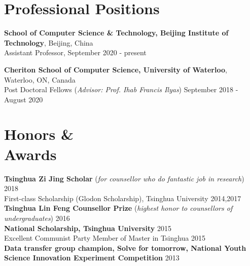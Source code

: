 \documentclass[margin]{cv}
\newenvironment{list1}{
  \begin{list}{\ding{113}}{%
      \setlength{\itemsep}{0in}
      \setlength{\parsep}{0in} \setlength{\pars
      kip}{0in}
      \setlength{\topsep}{0in} \setlength{\partopsep}{0in} 
      \setlength{\leftmargin}{0.17in}}}{\end{list}}
\newenvironment{list2}{
  \begin{list}{$\bullet$}{%
      \setlength{\itemsep}{0in}
      \setlength{\parsep}{0in} \setlength{\parskip}{0in}
      \setlength{\topsep}{0in} \setlength{\partopsep}{0in} 
      \setlength{\leftmargin}{0.2in}}}{\end{list}}
\begin{document}
\begin{resume}

\section{\sc Professional Positions}
{\bf School of Computer Science \& Technology, Beijing Institute of Technology}, Beijing, China \\
Assistant Professor, \hfill September 2020 - present

{\bf Cheriton School of Computer Science, University of Waterloo}, Waterloo, ON, Canada \\
Post Doctoral Fellows ({\it Advisor: Prof. Ihab Francis Ilyas}) \hfill September 2018 - August 2020

\section{\sc Honors \& \\ Awards}
{\bf Tsinghua Zi Jing Scholar} ({\it for counsellor who do fantastic job in research}) \hfill 2018 \\
First-class Scholarship (Glodon Scholarship), Tsinghua University \hfill 2014,2017 \\
{\bf Tsinghua Lin Feng Counsellor Prize} ({\it highest honor to counsellors of undergraduates}) \hfill 2016 \\
{\bf National Scholarship, Tsinghua University} \hfill 2015 \\
Excellent Communist Party Member of Master in Tsinghua \hfill 2015 \\
{\bf Data transfer group champion, Solve for tomorrow, National Youth Science Innovation Experiment Competition} \hfill 2013


\end{resume}
\end{document}
